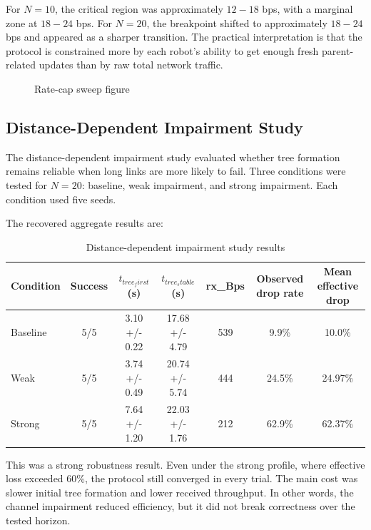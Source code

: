\documentclass[11pt,a4paper]{article}
\begin{document}
For \(N = 10\), the critical region was approximately \(12-18\) bps, with a marginal zone at \(18-24\) bps. For \(N = 20\), the breakpoint shifted to approximately \(18-24\) bps and appeared as a sharper transition. The practical interpretation is that the protocol is constrained more by each robot's ability to get enough fresh parent-related updates than by raw total network traffic.

\begin{figure}[htbp]
  \centering
  \caption{Rate-cap sweep figure}
  \label{fig:rate_cap}
\end{figure}

\subsection{Distance-Dependent Impairment Study}

The distance-dependent impairment study evaluated whether tree formation remains reliable when long links are more likely to fail. Three conditions were tested for \(N = 20\): baseline, weak impairment, and strong impairment. Each condition used five seeds.

The recovered aggregate results are:

\begin{table}[htbp]
  \centering
  \caption{Distance-dependent impairment study results}
  \label{tab:distance_impairment}
  \begin{tabular}{|l|c|c|c|c|c|c|}
    \hline
    Condition & Success & \(t_{tree_first}\) (s) & \(t_{tree_stable}\) (s) & rx\_Bps & Observed drop rate & Mean effective drop \\
    \hline
    Baseline & 5/5 & 3.10 +/- 0.22 & 17.68 +/- 4.79 & 539 & 9.9\% & 10.0\% \\
    Weak & 5/5 & 3.74 +/- 0.49 & 20.74 +/- 5.74 & 444 & 24.5\% & 24.97\% \\
    Strong & 5/5 & 7.64 +/- 1.20 & 22.03 +/- 1.76 & 212 & 62.9\% & 62.37\% \\
    \hline
  \end{tabular}
\end{table}

This was a strong robustness result. Even under the strong profile, where effective loss exceeded 60\%, the protocol still converged in every trial. The main cost was slower initial tree formation and lower received throughput. In other words, the channel impairment reduced efficiency, but it did not break correctness over the tested horizon.
\end{document}
